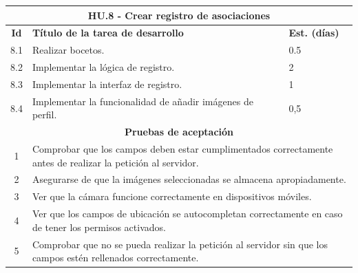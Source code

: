 \begin{tabular}{|c|p{9.5cm}|p{1cm}|}
	\hline
	\multicolumn{3}{|c|}{\textbf{HU.8 - Crear registro de asociaciones}} \\
	\hline
	\textbf{Id} & \textbf{Título de la tarea de desarrollo} & \textbf{Est. (días)} \\
	\hline
	8.1 & Realizar bocetos. & 0.5 \\ \hline
	8.2 &  Implementar la lógica de registro. & 2 \\ \hline
	8.3 &  Implementar la interfaz de registro. & 1 \\ \hline
	8.4 &  Implementar la funcionalidad de añadir imágenes de perfil. & 0,5 \\ \hline
	\multicolumn{3}{|c|}{\textbf{Pruebas de aceptación}} \\ \hline
	1 & \multicolumn{2}{|p{10cm}|}{Comprobar que los campos deben estar cumplimentados correctamente antes de realizar la petición al servidor.} \\ \hline
	2 & \multicolumn{2}{|p{10cm}|}{Asegurarse de que la imágenes seleccionadas se almacena apropiadamente.} \\ \hline
	3 & \multicolumn{2}{|p{10cm}|}{Ver que la cámara funcione correctamente en dispositivos móviles.} \\ \hline
	4 & \multicolumn{2}{|p{10cm}|}{Ver que los campos de ubicación se autocompletan correctamente en caso de tener los permisos activados.} \\ \hline
	5 & \multicolumn{2}{|p{10cm}|}{Comprobar que no se pueda realizar la petición al servidor sin que los campos estén rellenados correctamente.} \\\hline
	
\end{tabular} \\ \\

